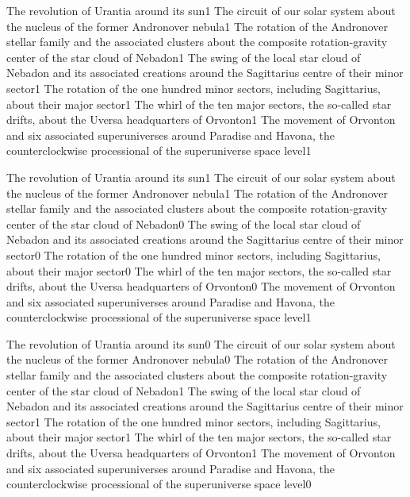 {The revolution of Urantia around its sun}{1}
{The circuit of our solar system about the nucleus of the former Andronover nebula}{1}
{The rotation of the Andronover stellar family and the associated clusters about the composite rotation-gravity center of the star cloud of Nebadon}{1}
{The swing of the local star cloud of Nebadon and its associated creations around the Sagittarius centre of their minor sector}{1}
{The rotation of the one hundred minor sectors, including Sagittarius, about their major sector}{1}
{The whirl of the ten major sectors, the so-called star drifts, about the Uversa headquarters of Orvonton}{1}
{The movement of Orvonton and six associated superuniverses around Paradise and Havona, the counterclockwise processional of the superuniverse space level}{1}
\qstop

{The revolution of Urantia around its sun}{1}
{The circuit of our solar system about the nucleus of the former Andronover nebula}{1}
{The rotation of the Andronover stellar family and the associated clusters about the composite rotation-gravity center of the star cloud of Nebadon}{0}
{The swing of the local star cloud of Nebadon and its associated creations around the Sagittarius centre of their minor sector}{0}
{The rotation of the one hundred minor sectors, including Sagittarius, about their major sector}{0}
{The whirl of the ten major sectors, the so-called star drifts, about the Uversa headquarters of Orvonton}{0}
{The movement of Orvonton and six associated superuniverses around Paradise and Havona, the counterclockwise processional of the superuniverse space level}{1}
\qstop

{The revolution of Urantia around its sun}{0}
{The circuit of our solar system about the nucleus of the former Andronover nebula}{0}
{The rotation of the Andronover stellar family and the associated clusters about the composite rotation-gravity center of the star cloud of Nebadon}{1}
{The swing of the local star cloud of Nebadon and its associated creations around the Sagittarius centre of their minor sector}{1}
{The rotation of the one hundred minor sectors, including Sagittarius, about their major sector}{1}
{The whirl of the ten major sectors, the so-called star drifts, about the Uversa headquarters of Orvonton}{1}
{The movement of Orvonton and six associated superuniverses around Paradise and Havona, the counterclockwise processional of the superuniverse space level}{0}
\qstop

